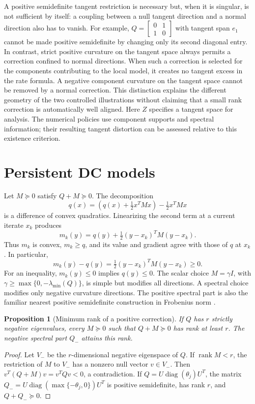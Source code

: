 \documentclass[pdflatex,sn-mathphys-num]{sn-jnl}
\theoremstyle{thmstyleone}
\newtheorem{proposition}[theorem]{Proposition}
\theoremstyle{thmstylethree}
\newcommand{\rank}{\operatorname{rank}}
\newcommand{\diag}{\operatorname{diag}}
\begin{document}
A positive semidefinite tangent restriction is necessary but, when it
is singular, is not sufficient by itself: a coupling between a null
tangent direction and a normal direction also has to vanish. For
example, $Q=\left[\begin{smallmatrix}0&1\\1&0\end{smallmatrix}\right]$
with tangent span $e_1$ cannot be made positive semidefinite by changing
only its second diagonal entry. In contrast, strict positive curvature
on the tangent space always permits a correction confined to normal
directions. When such a correction is selected for the components
contributing to the local model, it creates no tangent excess in the
rate formula. A negative component curvature on the tangent space
cannot be removed by a normal correction. This distinction explains
the different geometry of the two controlled illustrations without
claiming that a small rank correction is automatically well aligned.
Here $Z$ specifies a tangent space for analysis. The numerical policies
use component supports and spectral information; their resulting tangent
distortion can be assessed relative to this existence criterion.


\section{Persistent DC models}\label{sec:models}
Let $M\succeq0$ satisfy $Q+M\succeq0$. The decomposition
\[
 q(x)=\left(q(x)+\tfrac12x^TMx\right)-\tfrac12x^TMx
\]
is a difference of convex quadratics. Linearizing the second term at a
current iterate $x_k$ produces
\begin{equation}\label{eq:majorant}
 m_k(y)=q(y)+\tfrac12(y-x_k)^TM(y-x_k).
\end{equation}
Thus $m_k$ is convex, $m_k\geq q$, and its value and gradient agree
with those of $q$ at $x_k$. In particular,
\begin{equation}\label{eq:gap}
 m_k(y)-q(y)=\tfrac12(y-x_k)^TM(y-x_k)\geq0.
\end{equation}
For an inequality, $m_k(y)\leq0$ implies $q(y)\leq0$.
The scalar choice $M=\gamma I$, with
$\gamma\geq\max\{0,-\lambda_{\min}(Q)\}$, is simple but modifies all
directions. A spectral choice modifies only negative curvature directions. The
positive spectral part is also the familiar nearest positive
semidefinite construction in Frobenius norm \citep{Higham1988}.

\begin{proposition}[Minimum rank of a positive correction]\label{prop:rank}
If $Q$ has $r$ strictly negative eigenvalues, every $M\succeq0$ such
that $Q+M\succeq0$ has rank at least $r$. The negative spectral part
$Q_-$ attains this rank.
\end{proposition}
\begin{proof}
Let $V_-$ be the $r$-dimensional negative eigenspace of $Q$. If
$\rank M<r$, the restriction of $M$ to $V_-$ has a nonzero null vector
$v\in V_-$. Then $v^T(Q+M)v=v^TQv<0$, a contradiction.
If $Q=U\diag(\theta_j)U^T$, the matrix
$Q_-=U\diag(\max\{-\theta_j,0\})U^T$ is positive semidefinite,
has rank $r$, and $Q+Q_-\succeq0$.
\end{proof}
\end{document}

